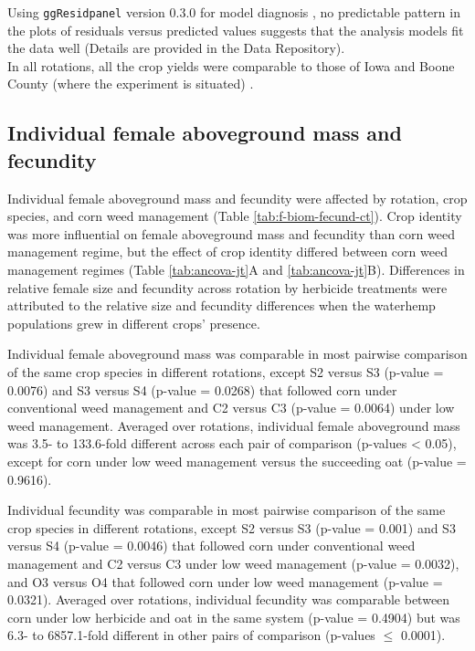 \documentclass[
]{article}
\begin{document}
Using \texttt{ggResidpanel} version 0.3.0 for model diagnosis \citep{goodeGgResidpanelPanelsInteractive2019}, no predictable pattern in the plots of residuals versus predicted values suggests that the analysis models fit the data well (Details are provided in the Data Repository).\\
In all rotations, all the crop yields were comparable to those of Iowa and Boone County (where the experiment is situated) \citep{nguyenWeedCommunityCompositioninpreparation}.

\hypertarget{individual-female-aboveground-mass-and-fecundity-2}{%
\subsection*{Individual female aboveground mass and fecundity}\label{individual-female-aboveground-mass-and-fecundity-2}}

Individual female aboveground mass and fecundity were affected by rotation, crop species, and corn weed management (Table \ref{tab:f-biom-fecund-ct}). Crop identity was more influential on female aboveground mass and fecundity than corn weed management regime, but the effect of crop identity differed between corn weed management regimes (Table \ref{tab:ancova-jt}A and \ref{tab:ancova-jt}B). Differences in relative female size and fecundity across rotation by herbicide treatments were attributed to the relative size and fecundity differences when the waterhemp populations grew in different crops' presence.

Individual female aboveground mass was comparable in most pairwise comparison of the same crop species in different rotations, except S2 versus S3 (p-value = 0.0076) and S3 versus S4 (p-value = 0.0268) that followed corn under conventional weed management and C2 versus C3 (p-value = 0.0064) under low weed management. Averaged over rotations, individual female aboveground mass was 3.5- to 133.6-fold different across each pair of comparison (p-values \textless{} 0.05), except for corn under low weed management versus the succeeding oat (p-value = 0.9616).

Individual fecundity was comparable in most pairwise comparison of the same crop species in different rotations, except S2 versus S3 (p-value = 0.001) and S3 versus S4 (p-value = 0.0046) that followed corn under conventional weed management and C2 versus C3 under low weed management (p-value = 0.0032), and O3 versus O4 that followed corn under low weed management (p-value = 0.0321). Averaged over rotations, individual fecundity was comparable between corn under low herbicide and oat in the same system (p-value = 0.4904) but was 6.3- to 6857.1-fold different in other pairs of comparison (p-values \(\leq\) 0.0001).
\end{document}

